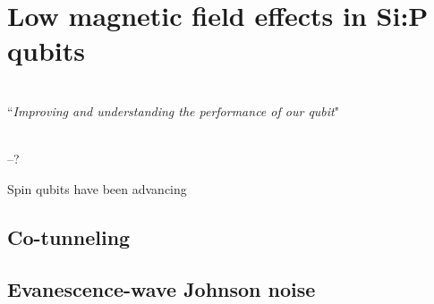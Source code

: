 
\chapter{Low magnetic field effects in Si:P qubits} %

\label{Chapter6} 


\HRule
\vspace{0.5cm} \hspace{2cm}
\small
\hangindent=4cm
\\
        ``\emph{Improving and understanding the performance of our qubit}"
\\ \\
\hangindent=4cm
\begin{flushright}
--? \\
\end{flushright}

\vspace{0.5cm}

\noindent \HRule
\clearpage

Spin qubits have been advancing 

\section{Co-tunneling}

\section{Evanescence-wave Johnson noise}


